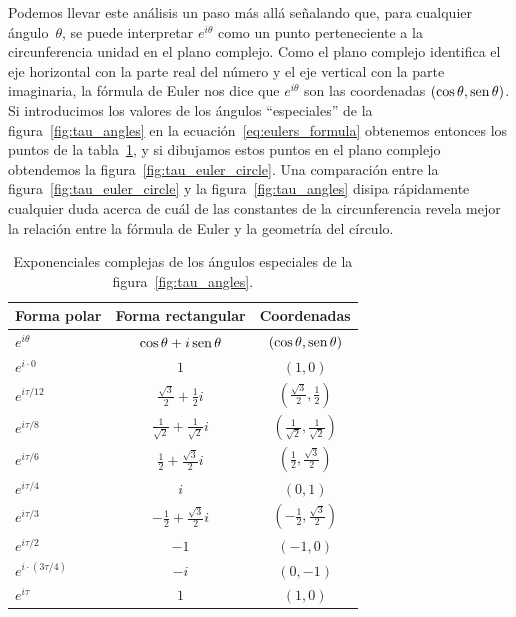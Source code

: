 Podemos llevar este análisis un paso más allá señalando que, para cualquier ángulo~$\theta$, se puede interpretar $e^{i\theta}$ como un punto perteneciente a la circunferencia unidad en el plano complejo. Como el plano complejo identifica el eje horizontal con la parte real del número y el eje vertical con la parte imaginaria, la fórmula de Euler nos dice que $e^{i\theta}$ son las coordenadas $(\cos\theta, \mbox{sen}\,\theta)$. Si introducimos los valores de los ángulos ``especiales'' de la figura~\ref{fig:tau_angles} en la ecuación~\eqref{eq:eulers_formula} obtenemos entonces los puntos de la tabla~\ref{table:complex_exponentials}, y si dibujamos estos puntos en el plano complejo obtendemos la figura~\ref{fig:tau_euler_circle}. Una comparación entre la figura~\ref{fig:tau_euler_circle} y la figura~\ref{fig:tau_angles} disipa rápidamente cualquier duda acerca de cuál de las constantes de la circunferencia revela mejor la relación entre la fórmula de Euler y la geometría del círculo.

\begin{table}
\begin{center}
\begin{tabular}{lcc}
Forma polar & Forma rectangular & Coordenadas \\ \hline\hline
$e^{i\theta}$ & $\cos\theta + i\,\mbox{sen}\,\theta$ & $(\cos\theta, \mbox{sen}\,\theta)$ \\ \hline
$e^{i\cdot0}$ & $1$ & $(1, 0)$ \smallskip \\
$e^{i\tau/12}$ & $\frac{\sqrt{3}}{2} + \frac{1}{2}i$ & $(\frac{\sqrt{3}}{2}, \frac{1}{2})$ \smallskip \\
$e^{i\tau/8}$ & $\frac{1}{\sqrt{2}} +  \frac{1}{\sqrt{2}}i$ & $(\frac{1}{\sqrt{2}}, \frac{1}{\sqrt{2}})$ \smallskip \\
$e^{i\tau/6}$ & $\frac{1}{2} +\frac{\sqrt{3}}{2} i$ & $(\frac{1}{2}, \frac{\sqrt{3}}{2})$ \smallskip \\
$e^{i\tau/4}$ & $i$ & $(0, 1)$ \smallskip \\
$e^{i\tau/3}$ & $-\frac{1}{2} +\frac{\sqrt{3}}{2} i$ & $(-\frac{1}{2}, \frac{\sqrt{3}}{2})$ \smallskip \\
$e^{i\tau/2}$ & $-1$ & $(-1, 0)$ \smallskip \\
$e^{i\cdot(3\tau/4)}$ & $-i$ & $(0, -1)$ \smallskip \\
$e^{i\tau}$ & $1$ & $(1, 0)$
\end{tabular}
\end{center}
\caption{Exponenciales complejas de los ángulos especiales de la figura~\ref{fig:tau_angles}.\label{table:complex_exponentials}}
\end{table}

